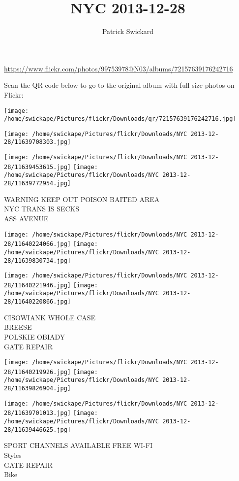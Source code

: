 \documentclass[10pt,letterpaper]{article}
\title{NYC 2013-12-28}
\author{Patrick Swickard}
\date{}
\begin{document}
\maketitle

\url{https://www.flickr.com/photos/99753978@N03/albums/72157639176242716}

Scan the QR code below to go to the original album with full-size photos on Flickr:

\texttt{[image: /home/swickape/Pictures/flickr/Downloads/qr/72157639176242716.jpg]}
\pagebreak

\texttt{[image: /home/swickape/Pictures/flickr/Downloads/NYC 2013-12-28/11639708303.jpg]}

\vspace{0.25in}
\texttt{[image: /home/swickape/Pictures/flickr/Downloads/NYC 2013-12-28/11639453615.jpg]}
\texttt{[image: /home/swickape/Pictures/flickr/Downloads/NYC 2013-12-28/11639772954.jpg]}

WARNING KEEP OUT POISON BAITED AREA\\
NYC TRANS IS SECKS\\
ASS AVENUE
\pagebreak

\texttt{[image: /home/swickape/Pictures/flickr/Downloads/NYC 2013-12-28/11640224066.jpg]}
\texttt{[image: /home/swickape/Pictures/flickr/Downloads/NYC 2013-12-28/11639830734.jpg]}

\texttt{[image: /home/swickape/Pictures/flickr/Downloads/NYC 2013-12-28/11640221946.jpg]}
\texttt{[image: /home/swickape/Pictures/flickr/Downloads/NYC 2013-12-28/11640220866.jpg]}

CISOWIANK WHOLE CASE\\
BREESE\\
POLSKIE OBIADY\\
GATE REPAIR
\pagebreak

\texttt{[image: /home/swickape/Pictures/flickr/Downloads/NYC 2013-12-28/11640219926.jpg]}
\texttt{[image: /home/swickape/Pictures/flickr/Downloads/NYC 2013-12-28/11639826904.jpg]}

\texttt{[image: /home/swickape/Pictures/flickr/Downloads/NYC 2013-12-28/11639701013.jpg]}
\texttt{[image: /home/swickape/Pictures/flickr/Downloads/NYC 2013-12-28/11639446625.jpg]}

SPORT CHANNELS AVAILABLE FREE WI{-}FI\\
Styles\\
GATE REPAIR\\
Bike
\pagebreak
\end{document}
